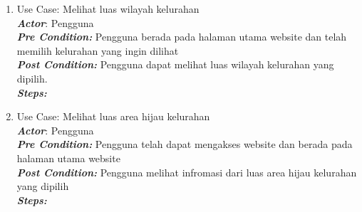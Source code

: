 \begin{enumerate}
	\item Use Case: Melihat luas wilayah kelurahan\\
	\textit{\textbf{Actor}}: Pengguna \\
	\textit{\textbf{Pre Condition: }}Pengguna berada pada halaman utama website dan telah memilih kelurahan yang ingin dilihat\\
	\textit{\textbf{Post Condition:}} Pengguna dapat melihat luas wilayah kelurahan yang dipilih.\\
	\textit{\textbf{Steps: }}
	\begin{table}[H]
		\centering
	\end{table}
	\item Use Case: Melihat luas area hijau kelurahan\\
	\textit{\textbf{Actor}}: Pengguna \\
	\textit{\textbf{Pre Condition: }}Pengguna telah dapat mengakses website dan berada pada halaman utama website\\
	\textit{\textbf{Post Condition:}} Pengguna melihat infromasi dari luas area hijau kelurahan yang dipilih\\
	\textit{\textbf{Steps: }}
	\begin{table}[H]
		\centering
	\end{table}
	

\end{enumerate}
